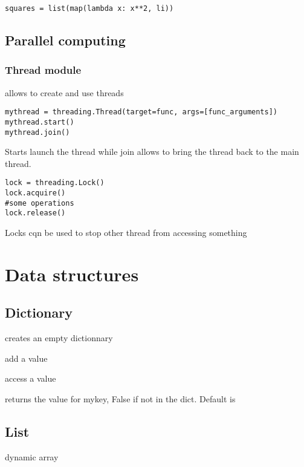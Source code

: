 \begin{lstlisting}
squares = list(map(lambda x: x**2, li))
\end{lstlisting}


	\subsection{Parallel computing}

		\subsubsection{Thread module}

			 allows to create and use threads

\begin{lstlisting}
mythread = threading.Thread(target=func, args=[func_arguments])
mythread.start()
mythread.join()
\end{lstlisting}

			Starts launch the thread while join allows to bring the thread back to the main thread.

\begin{lstlisting}
lock = threading.Lock()
lock.acquire()
#some operations
lock.release()
\end{lstlisting}

		Locks cqn be used to stop other thread from accessing something


\section{Data structures}


	\subsection{Dictionary}

		 creates an empty dictionnary

		 add a value

		 access a value

		 returns the value for mykey, False if not in the dict. Default is 

	\subsection{List}

		dynamic array

